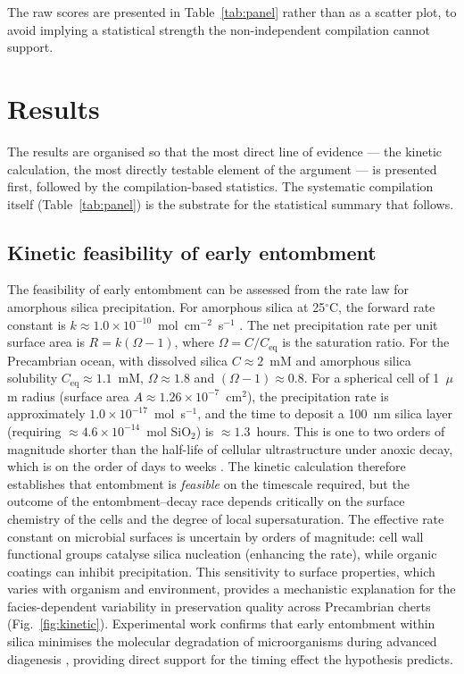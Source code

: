 \documentclass[11pt]{article}
\begin{document}
\noindent The raw scores are presented in Table~\ref{tab:panel} rather than as a scatter plot, to
avoid implying a statistical strength the non-independent compilation cannot support.

\section{Results}

The results are organised so that the most direct line of evidence --- the kinetic calculation,
the most directly testable element of the argument --- is presented first, followed by the
compilation-based statistics. The systematic compilation itself (Table~\ref{tab:panel}) is the
substrate for the statistical summary that follows.

\subsection{Kinetic feasibility of early entombment}

The feasibility of early entombment can be assessed from the rate law for amorphous silica
precipitation. For amorphous silica at 25$^\circ$C, the forward rate constant is
$k \approx 1.0 \times 10^{-10}$~mol~cm$^{-2}$~s$^{-1}$ \citep{Rimstidt1980}. The net precipitation
rate per unit surface area is $R = k(\Omega - 1)$, where $\Omega = C/C_{\mathrm{eq}}$ is the
saturation ratio. For the Precambrian ocean, with dissolved silica $C \approx 2$~mM
\citep{Siever1992} and amorphous silica solubility $C_{\mathrm{eq}} \approx 1.1$~mM,
$\Omega \approx 1.8$ and $(\Omega - 1) \approx 0.8$. For a spherical cell of 1~$\mu$m radius (surface
area $A \approx 1.26 \times 10^{-7}$~cm$^2$), the precipitation rate is approximately
$1.0 \times 10^{-17}$~mol~s$^{-1}$, and the time to deposit a 100~nm silica layer (requiring
$\approx 4.6 \times 10^{-14}$~mol SiO$_2$) is $\approx 1.3$~hours. This is one to two orders of
magnitude shorter than the half-life of cellular ultrastructure under anoxic decay, which is on the
order of days to weeks \citep{TaxonRedox2025}. The kinetic calculation therefore establishes that entombment is
\emph{feasible} on the timescale required, but the outcome of the entombment--decay race depends
critically on the surface chemistry of the cells and the degree of local supersaturation. The
effective rate constant on microbial surfaces is uncertain by orders of magnitude: cell wall
functional groups catalyse silica nucleation (enhancing the rate), while organic coatings can inhibit
precipitation. This sensitivity to surface properties, which varies with organism and environment,
provides a mechanistic explanation for the facies-dependent variability in preservation quality
across Precambrian cherts (Fig.~\ref{fig:kinetic}). Experimental work confirms that early entombment
within silica minimises the molecular degradation of microorganisms during advanced diagenesis
\citep{Alleon2016b}, providing direct support for the timing effect the hypothesis predicts.
\end{document}

